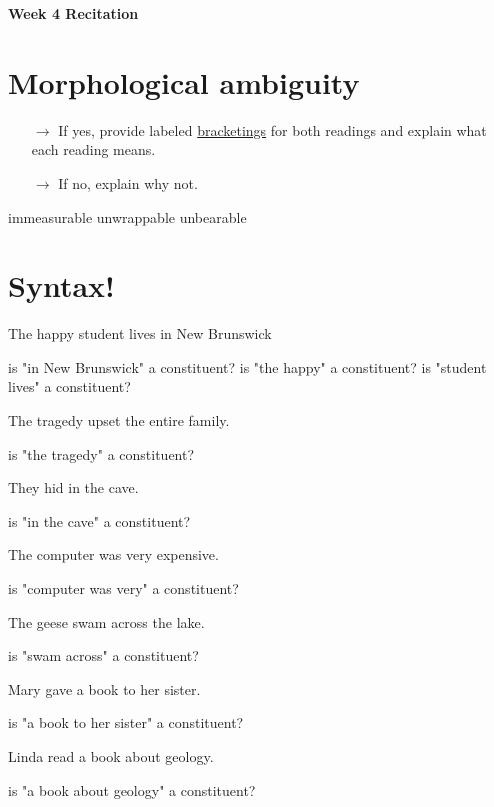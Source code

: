 \documentclass[a4paper,11pt]{article}
\begin{document}
\begin{center}
\Large{\textbf{Week 4 Recitation}}
\end{center}


\section{Morphological ambiguity}


\begin{itemize}
\item[$\rightarrow$] If yes, provide labeled \underline{bracketings} for both readings and explain what each reading means.
\item[$\rightarrow$] If no, explain why not.
\vspace{0.5cm}
\end{itemize}
\begin{exe}
\ex immeasurable 
\ex unwrappable
\ex unbearable
\end{exe}

\vspace{2cm}



\section{Syntax!}


\begin{exe}
\ex The happy student lives in New Brunswick \begin{xlist}
	\ex is "in New Brunswick" a constituent?
	\ex is "the happy" a constituent? 
	\ex is "student lives" a constituent?
\end{xlist}
\ex The tragedy upset the entire family. \begin{xlist}
	\ex is "the tragedy" a constituent?
\end{xlist}
\ex They hid in the cave. \begin{xlist}
	\ex is "in the cave" a constituent? 
\end{xlist}
\ex The computer was very expensive. \begin{xlist}
	\ex is "computer was very" a constituent?
\end{xlist}
\ex The geese swam across the lake. \begin{xlist}
	\ex is "swam across" a constituent? 
\end{xlist}
\ex Mary gave a book to her sister. \begin{xlist}
	\ex is "a book to her sister" a constituent?
\end{xlist}
\ex Linda read a book about geology. \begin{xlist}
	\ex is "a book about geology" a constituent?
\end{xlist}
\end{exe}
\end{document}
